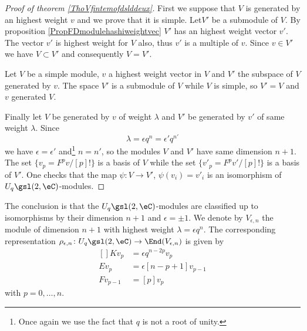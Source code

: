 \begin{proof}[Proof of theorem \ref{ThoVfintemofdslddeux}]
    First we suppose that \( V\) is generated by an highest weight \( v\) and we prove that it is simple. Let\( V'\) be a submodule of \( V\). By proposition \ref{PropFDmodulehashiweightvec} \( V'\) has an highest weight vector \( v'\). The vector \( v'\) is highest weight for \( V\) also, thus \( v'\) is a multiple of \( v\). Since \( v\in V'\) we have \( V\subset V'\) and consequently \( V=V'\).

    Let \( V\) be a simple module, $v$ a highest weight vector in \( V\) and \( V'\) the subspace of \( V\) generated by \( v\). The space \( V'\) is a submodule of \( V\) while \( V\) is simple, so \( V'=V\) and \( v\) generated \( V\).


    Finally let \( V\) be generated by \( v\) of weight \( \lambda\) and \( V'\) be generated by \( v'\) of same weight \( \lambda\). Since
    \begin{equation}
        \lambda=\epsilon q^n=\epsilon'q^{n'}
    \end{equation}
    we have \( \epsilon=\epsilon'\) and\footnote{Once again we use the fact that \( q\) is not a root of unity.} \( n=n'\), so the modules \( V\) and \( V'\) have same dimension \( n+1\). The set \( \{ v_p=F^pv/[p]! \}\) is a basis of \( V\) while the set \( \{ v'_p=F^pv'/[p]! \}\) is a basis of \( V'\). One checks that the map \( \psi\colon V\to V'\), \( \psi(v_i)=v'_i\) is an isomorphism of \( U_q\gsl(2,\eC)\)-modules.
\end{proof}

The conclusion is that the \( U_q\gsl(2,\eC)\)-modules are classified up to isomorphisms by their dimension \( n+1\) and \( \epsilon=\pm 1\). We denote by \( V_{\epsilon,n}\) the module of dimension \( n+1\) with highest weight \( \lambda=\epsilon q^n\). The corresponding representation \( \rho_{\epsilon,n}\colon U_q\gsl(2,\eC)\to \End(V_{\epsilon,n})\) is given by
\begin{equation}
    \begin{aligned}[]
        Kv_p&=\epsilon q^{n-2p}v_p\\
        Ev_p&=\epsilon[n-p+1]v_{p-1}\\
        Fv_{p-1}&=[p]v_p
    \end{aligned}
\end{equation}
with \( p=0,\ldots,n\).

